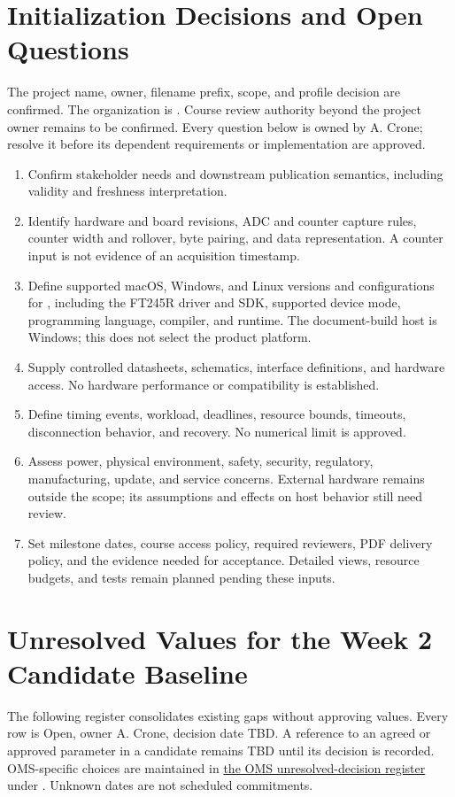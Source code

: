 \section{Initialization Decisions and Open Questions}
\label{Section:SP800OpenQuestions}
The project name, owner, filename prefix, scope, and profile decision are
confirmed. The organization is \Organization. Course review authority beyond the project
owner remains to be confirmed. Every question below is owned by A. Crone; resolve it
before its dependent requirements or implementation are approved.
\begin{enumerate}
\item Confirm stakeholder needs and downstream publication semantics,
including validity and freshness interpretation.
\item Identify hardware and board revisions, ADC and counter capture rules,
counter width and rollover, byte pairing, and data representation. A counter
input is not evidence of an acquisition timestamp.
\item Define supported macOS, Windows, and Linux versions and configurations for
, including the FT245R driver and SDK, supported
device mode, programming language, compiler, and runtime.
The document-build host is Windows; this does not select the product platform.
\item Supply controlled datasheets, schematics, interface definitions, and
hardware access. No hardware performance or compatibility is established.
\item Define timing events, workload, deadlines, resource bounds, timeouts,
disconnection behavior, and recovery. No numerical limit is approved.
\item Assess power, physical environment, safety, security, regulatory,
manufacturing, update, and service concerns. External hardware remains outside
the scope; its assumptions and effects on host behavior still need review.
\item Set milestone dates, course access policy, required reviewers, PDF
delivery policy, and the evidence needed for acceptance. Detailed views,
resource budgets, and tests remain planned pending these inputs.
\end{enumerate}

\section{Unresolved Values for the Week 2 Candidate Baseline}
\label{Section:Week2UnresolvedValues}
The following register consolidates existing gaps without approving values.
Every row is Open, owner A. Crone, decision date TBD. A reference to an agreed
or approved parameter in a candidate remains TBD until its decision is recorded.
OMS-specific choices are maintained in
\hyperref[Table:OMSUnresolvedDecisions]{the OMS unresolved-decision register}
under . Unknown dates are not scheduled commitments.

